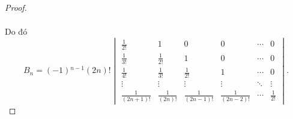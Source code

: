 \documentclass[class=linear-algebra,crop=false]{standalone}
\begin{document}
\begin{proof}
\begin{align*}
	\end{align*}
	\endgroup{}
	\par Do đó
	\[
		B_{n} = (-1){}^{n-1}(2n)!
		\begin{vmatrix}
			\frac{1}{2!}      & 1               & 0                 & 0                 & \cdots & 0            \\
			\frac{1}{3!}      & \frac{1}{2!}    & 1                 & 0                 & \cdots & 0            \\
			\frac{1}{4!}      & \frac{1}{3!}    & \frac{1}{2!}      & 1                 & \cdots & 0            \\
			\vdots            & \vdots          & \vdots            & \vdots            & \ddots & \vdots       \\
			\frac{1}{(2n+1)!} & \frac{1}{(2n)!} & \frac{1}{(2n-1)!} & \frac{1}{(2n-2)!} & \cdots & \frac{1}{2!}
		\end{vmatrix}.
	\]


\end{proof}
\end{document}
